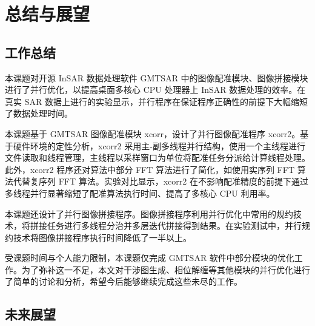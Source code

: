\chapter{总结与展望}

\section{工作总结}

本课题对开源 InSAR 数据处理软件 GMTSAR 中的图像配准模块、图像拼接模块进行了并行优化，以提高桌面多核心 CPU 处理器上 InSAR 数据处理的效率。在真实 SAR 数据上进行的实验显示，并行程序在保证程序正确性的前提下大幅缩短了数据处理时间。

本课题基于 GMTSAR 图像配准模块 xcorr，设计了并行图像配准程序 xcorr2。基于硬件环境的定性分析，xcorr2 采用主-副多线程并行结构，使用一个主线程进行文件读取和线程管理，主线程以采样窗口为单位将配准任务分派给计算线程处理。此外，xcorr2 程序还对算法中部分 FFT 算法进行了简化，如使用实序列 FFT 算法代替复序列 FFT 算法。实验对比显示，xcorr2 在不影响配准精度的前提下通过多线程并行显著缩短了配准算法执行时间、提高了多核心 CPU 利用率。

本课题还设计了并行图像拼接程序。图像拼接程序利用并行优化中常用的规约技术，将拼接任务进行多线程分治并多层迭代拼接得到结果。在实验测试中，并行规约技术将图像拼接程序执行时间降低了一半以上。

受课题时间与个人能力限制，本课题仅完成 GMTSAR 软件中部分模块的优化工作。为了弥补这一不足，本文对干涉图生成、相位解缠等其他模块的并行优化进行了简单的讨论和分析，希望今后能够继续完成这些未尽的工作。

\section{未来展望}


